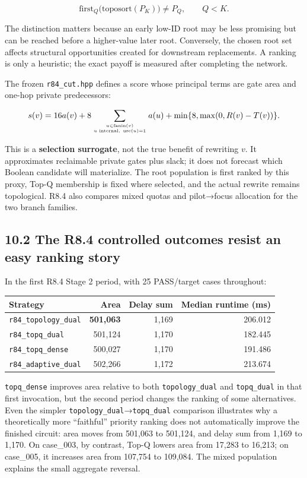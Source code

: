 \documentclass[a4paper,10pt]{article}
\theoremstyle{definition}
\theoremstyle{remark}
\begin{document}
\[
\mathrm{first}_{Q}\bigl(\mathrm{toposort}(P_K)\bigr)
\ne P_Q,\qquad Q<K.
\]

The distinction matters because an early low-ID root may be less promising but can be reached before a higher-value later root. Conversely, the chosen root set affects structural opportunities created for downstream replacements. A ranking is only a heuristic; the exact payoff is measured after completing the network.

The frozen \texttt{r84\_cut.hpp} defines a score whose principal terms are gate area and one-hop private predecessors:

\[
s(v)=16a(v)+8\sum_{u\in\mathrm{fanin}(v)\atop u\text{ internal},\ \mathrm{use}(u)=1}a(u)
+\min\{8,\max(0,R(v)-T(v))\}.
\]

This is a \textbf{selection surrogate}, not the true benefit of rewriting \(v\). It approximates reclaimable private gates plus slack; it does not forecast which Boolean candidate will materialize. The root population is first ranked by this proxy, Top-Q membership is fixed where selected, and the actual rewrite remains topological. R8.4 also compares mixed quotas and pilot→focus allocation for the two branch families.

\subsection{10.2 The R8.4 controlled outcomes resist an easy ranking story}\label{the-r8.4-controlled-outcomes-resist-an-easy-ranking-story}

In the first R8.4 Stage 2 period, with 25 PASS/target cases throughout:

\begin{longtable}[]{@{}lrrr@{}}
\toprule\noalign{}
Strategy & Area & Delay sum & Median runtime (ms) \\
\midrule\noalign{}
\endhead
\bottomrule\noalign{}
\endlastfoot
\texttt{r84\_topology\_dual} & \textbf{501,063} & 1,169 & 206.012 \\
\texttt{r84\_topq\_dual} & 501,124 & 1,170 & 182.445 \\
\texttt{r84\_topq\_dense} & 500,027 & 1,170 & 191.486 \\
\texttt{r84\_adaptive\_dual} & 502,266 & 1,172 & 213.674 \\
\end{longtable}

\texttt{topq\_dense} improves area relative to both \texttt{topology\_dual} and \texttt{topq\_dual} in that first invocation, but the second period changes the ranking of some alternatives. Even the simpler \texttt{topology\_dual}→\texttt{topq\_dual} comparison illustrates why a theoretically more ``faithful'' priority ranking does not automatically improve the finished circuit: area moves from 501,063 to 501,124, and delay sum from 1,169 to 1,170. On case\_003, by contrast, Top-Q lowers area from 17,283 to 16,213; on case\_005, it increases area from 107,754 to 109,084. The mixed population explains the small aggregate reversal.
\end{document}
